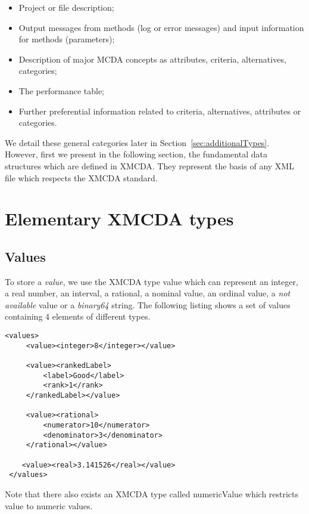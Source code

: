 \documentclass[a4paper,oneside,10 pt]{article}
\newcommand{\XMCDA}{{\asciifamily XMCDA}\xspace}
\newcommand{\XML}{{\asciifamily XML}\xspace}
\newcommand{\MCDA}{MCDA\xspace}
\newcommand{\code}{\asciifamily}
\begin{document}
\begin{itemize}
 \item Project or file description;
 \item Output messages from methods (log or error messages) and input information for methods (parameters);
 \item Description of major \MCDA concepts as attributes, criteria, alternatives, categories;
 \item The performance table;
 \item Further preferential information related to criteria, alternatives, attributes or categories.
\end{itemize}

We detail these general categories later in Section~\ref{sec:additionalTypes}. However, first we present in the following section, the fundamental data structures which are defined in \XMCDA. They represent the basis of any \XML file which respects the \XMCDA standard. 




\section{Elementary \XMCDA types}\label{sec:basicTypes}


\subsection{Values}

To store a \textit{value}, we use the \XMCDA type {\code value} which can represent an integer, a real number, an interval, a rational, a nominal value, an ordinal value, a \textit{not available} value or a {\em binary64} string. The following listing shows a set of values containing 4 elements of different types. 
{\code
\begin{lstlisting}[style=prototype]
 <values>
	 <value><integer>8</integer></value>

	 <value><rankedLabel>
	 	 <label>Good</label>
		 <rank>1</rank>
	 </rankedLabel></value>

	 <value><rational>
		 <numerator>10</numerator>
		 <denominator>3</denominator>
	 </rational></value>

 	<value><real>3.141526</real></value>
 </values> 
\end{lstlisting}
}
Note that there also exists an \XMCDA type called {\code numericValue} which restricts {\code value} to numeric values. 
\end{document}
